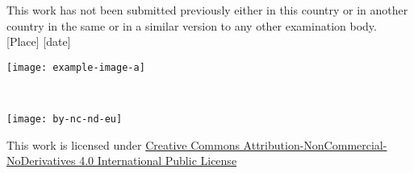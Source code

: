     This work has not been submitted previously either in this country or in another country in the same or in a similar version to any other examination body.\\
    
    [Place] [date]
    
    \begin{flushright}\texttt{[image: example-image-a]}\end{flushright}%

    ~\vfill
    \begin{center}
        \begin{minipage}[c]{0.25\linewidth}
            \texttt{[image: by-nc-nd-eu]}
        \end{minipage}\hfill
    \end{center}

    This work is licensed under \href{https://creativecommons.org/licenses/by-nc-nd/4.0/deed.en}{Creative Commons Attribution-NonCommercial-NoDerivatives 4.0 International Public License}
\fi

